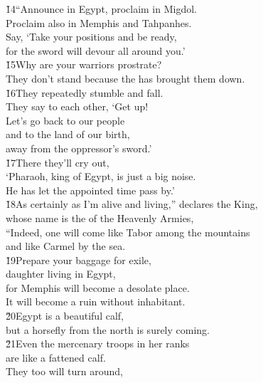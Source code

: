 \begin{poetry}
\poeml \v{14}``Announce in Egypt, proclaim in Migdol. \\
\poemll    Proclaim also in Memphis and Tahpanhes. \\
\poeml Say, `Take your positions and be ready, \\
\poemll    for the sword will devour all around you.' \\
\poeml \v{15}Why are your warriors prostrate? \\
\poemll    They don't stand because the  has brought them down. \\
\poeml \v{16}They repeatedly stumble and fall. \\
\poemll    They say to each other, `Get up! \\
\poeml Let's go back to our people \\
\poemll    and to the land of our birth, \\
\poemlll       away from the oppressor's sword.' \\
\poeml \v{17}There they'll cry out, \\
\poeml `Pharaoh, king of Egypt, is just a big noise. \\
\poemll    He has let the appointed time pass by.' \\
\poeml \v{18}As certainly as I'm alive and living,'' declares the King, \\
\poemll    whose name is the  of the Heavenly Armies, \\
\poeml ``Indeed, one will come like Tabor among the mountains \\
\poemll    and like Carmel by the sea. \\
\poeml \v{19}Prepare your baggage for exile, \\
\poemll    daughter living in Egypt, \\
\poeml for Memphis will become a desolate place. \\
\poemll    It will become a ruin without inhabitant. \\
\poeml \v{20}Egypt is a beautiful calf, \\
\poemll    but a horsefly from the north is surely coming. \\
\poeml \v{21}Even the mercenary troops in her ranks \\
\poemll    are like a fattened calf. \\
\poeml They too will turn around, \\

\end{poetry}
